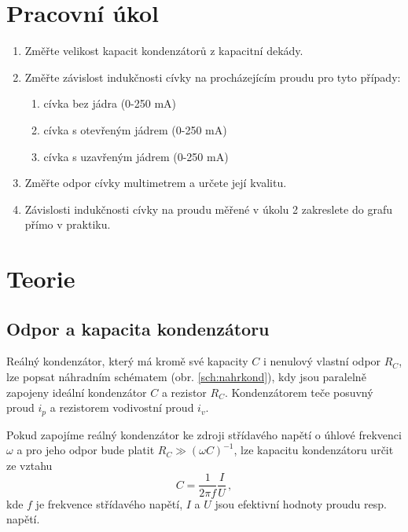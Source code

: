\documentclass{../concepts/prepareprotokol} %
\begin{document}
\renewcommand{\figurename}{Graf}
\renewcommand{\refname}{Literatura}

\maketitle

\section{Pracovní úkol}

\begin{enumerate}
    \item Změřte velikost kapacit kondenzátorů z kapacitní dekády.
    \item Změřte závislost indukčnosti cívky na procházejícím proudu pro tyto případy:
    \begin{enumerate}
        \item cívka bez jádra (0-250 mA)
        \item cívka s otevřeným jádrem (0-250 mA)
        \item cívka s uzavřeným jádrem (0-250 mA)
    \end{enumerate}

    \item Změřte odpor cívky multimetrem a určete její kvalitu.
    \item Závislosti indukčnosti cívky na proudu měřené v úkolu 2 zakreslete do grafu přímo v praktiku.
\end{enumerate}

\section{Teorie}
\subsection{Odpor a kapacita kondenzátoru}

Reálný kondenzátor, který má kromě své kapacity $C$ i nenulový vlastní odpor $R_C$, lze popsat náhradním schématem (obr. \ref{sch:nahrkond}), kdy jsou paralelně zapojeny ideální kondenzátor $C$ a rezistor $R_C$. Kondenzátorem teče posuvný proud $i_p$ a rezistorem vodivostní proud $i_v$.

Pokud zapojíme reálný kondenzátor ke zdroji střídavého napětí o úhlové frekvenci $\omega$ a pro jeho odpor bude platit $R_C \gg (\omega C)^{-1}$, lze kapacitu kondenzátoru určit ze vztahu \cite{studijni}
\begin{equation} \label{eq:c}
    C = \frac{1}{2 \pi f} \frac{I}{U} \, ,
\end{equation}
kde $f$ je frekvence střídavého napětí, $I$ a $U$ jsou efektivní hodnoty proudu resp. napětí.
\end{document}
